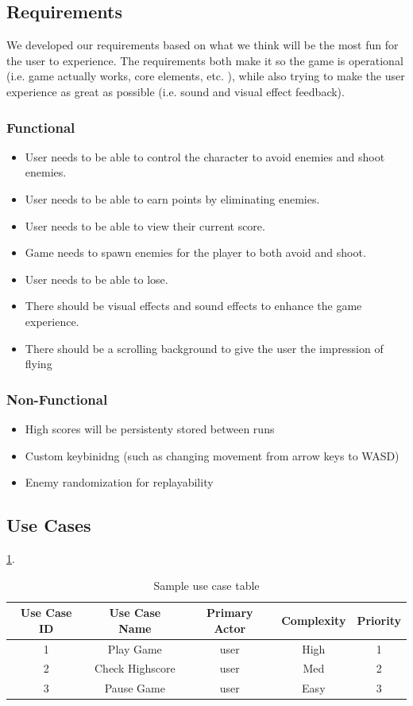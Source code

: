 \documentclass[10pt,conference,onecolumn,compsoc]{IEEEtran}
\begin{document}
\subsection{Requirements}
We developed our requirements based on what we think will be the most fun for the user to experience. The requirements both make it so the game is operational (i.e. game actually works, core elements, etc. ), while also trying to make the user experience as great as possible (i.e. sound and visual effect feedback).

\subsubsection{Functional}
\begin{itemize}
\item User needs to be able to control the character to avoid enemies and shoot enemies.
\item User needs to be able to earn points by eliminating enemies.
\item User needs to be able to view their current score.
\item Game needs to spawn enemies for the player to both avoid and shoot.
\item User needs to be able to lose.
\item There should be visual effects and sound effects to enhance the game experience.
\item There should be a scrolling background to give the user the impression of flying
\end{itemize}

\subsubsection{Non-Functional}
\begin{itemize}
\item High scores will be persistenty stored between runs
\item Custom keybinidng (such as changing movement from arrow keys to WASD)
\item Enemy randomization for replayability
\end{itemize}

\subsection{Use Cases}
 \ref{tab:useCaseIndex}.




\begin{table}
\centering
\begin{tabular}{|c|c|c|c|c|}
\hline
Use Case ID & Use Case Name & Primary Actor & Complexity & Priority \\
\hline \hline
1 & Play Game & user & High & 1\\
\hline
2 & Check Highscore & user & Med & 2\\
\hline
3 & Pause Game & user & Easy & 3\\
\hline
\end{tabular}
\caption{Sample use case table}
\label{tab:useCaseIndex}
\end{table}
\end{document}
